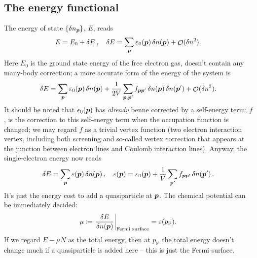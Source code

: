 \documentclass[hyperref, a4paper]{article}
\DeclareMathOperator{\bigO}{\mathcal{O}}
\newcommand*{\pfermi}{p_{\text{F}}}
\begin{document}
\subsection{The energy functional}

The energy of state $\{\var{n}_{\vb*{p}}\}$, $E$, reads 
\begin{equation}
    E = E_0 + \var{E}, \quad 
    \var{E}  = \sum_{\vb*{p}} \varepsilon_0(\vb*{p}) \var{n(\vb*{p})} + 
    \bigO(\var{n}^2).
    \label{eq:fermi-liquid.linear-energy}
\end{equation}
Here $E_0$ is the ground state energy of the free electron gas, 
 doesn't contain any many-body correction; 
a more accurate form of the energy of the system is 
\begin{equation}
    \var{E} = \sum_{\vb*{p}} \varepsilon_0(\vb*{p}) \var{n(\vb*{p})}
    + \frac{1}{2 V} \sum_{\vb*{p}, \vb*{p}'}
    f_{\vb*{p} \vb*{p}'} \var{n(\vb*{p})} \var{n(\vb*{p}')} + \bigO(\var{n}^3).
\end{equation}
It should be noted that $\epsilon_0(\vb*{p})$ 
has \emph{already} benne corrected by a self-energy term; 
$f$, is the correction to this self-energy term 
when the occupation function is changed;
we may regard $f$ as a trivial vertex function 
(two electron interaction vertex, 
including both screening and 
so-called vertex correction 
that appears at the junction between electron lines and Coulomb interaction lines).
Anyway, the single-electron energy now reads
\begin{equation}
    \var{E} = \sum_{\vb*{p}} \varepsilon(\vb*{p}) \var{n(\vb*{p})} , 
    \quad \varepsilon(\vb*{p}) = \varepsilon_0(\vb*{p}) 
    + \frac{1}{V} \sum_{\vb*{p}'} f_{\vb*{p} \vb*{p}'} \var{n(\vb*{p}')}.
    \label{eq:fermi-liquid.quasiparticle-energy}
\end{equation}
It's just the energy cost to add a quasiparticle at $\vb*{p}$.
The chemical potential can be immediately decided:
\begin{equation}
    \mu \coloneqq \eval{\fdv{E}{n(\vb*{p})}}_{\text{Fermi surface}} = \varepsilon(\pfermi).
\end{equation}
If we regard $E - \mu N$ as the total energy, 
then at $\pfermi$ the total energy doesn't change much if a quasiparticle is added here -- 
this is just the Fermi surface. 
\end{document}
